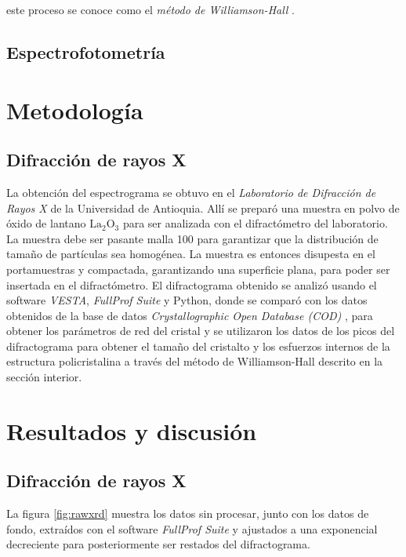 \documentclass[final,5p,times,twocolumn, nopreprintline]{elsarticle}
\numberwithin{equation}{section}
\begin{document}
este proceso se conoce como el \emph{método de Williamson-Hall} \cite{himabindu2021microstructural}.


\subsection{Espectrofotometría}

\section{Metodología}

\subsection{Difracción de rayos X}

La obtención del espectrograma se obtuvo en el \textit{Laboratorio de Difracción de Rayos X} de la Universidad de Antioquia. Allí se preparó una muestra en polvo de óxido de lantano $\text{La}_2\text{O}_3$ para ser analizada con el difractómetro del laboratorio. La muestra debe ser pasante malla 100 para garantizar que la distribución de tamaño de partículas sea homogénea. La muestra es entonces disupesta en el portamuestras y compactada, garantizando una superficie plana, para poder ser insertada en el difractómetro. El difractograma obtenido se analizó usando el software \textit{VESTA}, \textit{FullProf Suite} y Python, donde se comparó con los datos obtenidos de la base de datos \textit{Crystallographic Open Database (COD)} \cite{zachariasen1926kristallstruktur}, para obtener los parámetros de red del cristal y se utilizaron los datos de los picos del difractograma para obtener el tamaño del cristalto y los esfuerzos internos de la estructura policristalina a través del método de Williamson-Hall descrito en la sección interior.

\section{Resultados y discusión}

\subsection{Difracción de rayos X}

La figura \ref{fig:rawxrd} muestra los datos sin procesar, junto con los datos de fondo, extraídos con el software \textit{FullProf Suite} y ajustados a una exponencial decreciente para posteriormente ser restados del difractograma.
\end{document}
